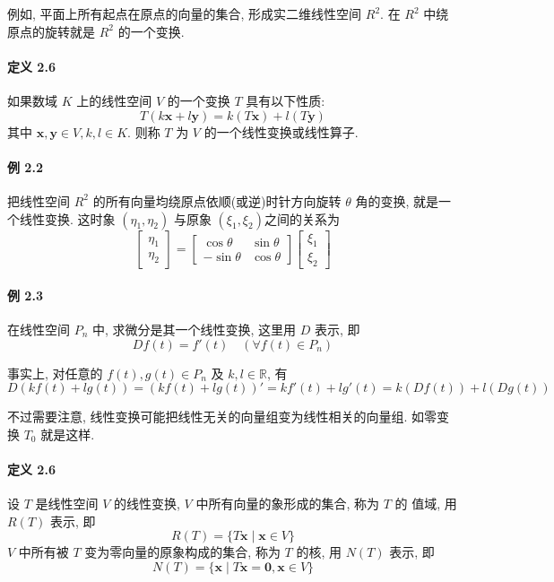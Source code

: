 \par 例如, 平面上所有起点在原点的向量的集合, 形成实二维线性空间 $R^2$. 在 $R^2$ 中绕
原点的旋转就是 $R^2$ 的一个变换.

\paragraph*{定义 2.6} 如果数域 $K$ 上的线性空间 $V$ 的一个变换 $T$ 具有以下性质:
$$
    T(k\bm{x} + l\bm{y}) = k(T\bm{x}) + l(T\bm{y})
$$
其中 $\bm{x}, \bm{y} \in V, k, l \in K$. 则称 $T$ 为 $V$ 的一个线性变换或线性算子.

\paragraph*{例 2.2} 把线性空间 $R^2$ 的所有向量均绕原点依顺(或逆)时针方向旋转 $\theta$ 角的变换, 就是一个线性变换. 这时象 $(\eta_1, \eta_2)$ 与原象 $(\xi_1, \xi_2)$之间的关系为
$$
    \begin{bmatrix}
        \eta_1 \\
        \eta_2
    \end{bmatrix} = \begin{bmatrix}
        \cos\theta  & \sin\theta \\
        -\sin\theta & \cos\theta
    \end{bmatrix} \begin{bmatrix}
        \xi_1 \\
        \xi_2
    \end{bmatrix}
$$

\paragraph*{例 2.3} 在线性空间 $P_n$ 中, 求微分是其一个线性变换, 这里用 $D$ 表示, 即
$$
    Df(t) = f'(t) \quad (\forall f(t) \in P_n)
$$
\par 事实上, 对任意的 $f(t), g(t) \in P_n$ 及 $k, l \in \mathbb{R}$, 有
$$
    D(kf(t) + lg(t)) = (kf(t) + lg(t))' = kf'(t) + lg'(t) = k(Df(t)) + l(Dg(t))
$$

\par 不过需要注意, 线性变换可能把线性无关的向量组变为线性相关的向量组. 如零变
换 $T_0$ 就是这样.

\paragraph*{定义 2.6} 设 $T$ 是线性空间 $V$ 的线性变换, $V$ 中所有向量的象形成的集合, 称为 $T$ 的
值域, 用 $R(T)$ 表示, 即
$$
    R(T) = \{T\bm{x} \mid \bm{x} \in V \}
$$
$V$ 中所有被 $T$ 变为零向量的原象构成的集合, 称为 $T$ 的核, 用 $N(T)$ 表示, 即
$$
    N(T) = \{\bm{x} \mid T\bm{x} = \bm{0}, \bm{x} \in V \}
$$

